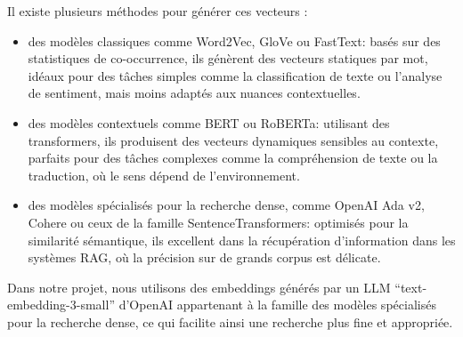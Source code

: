 Il existe plusieurs méthodes pour générer ces vecteurs :
\begin{itemize}[label=\textbullet]
    \item des modèles classiques comme Word2Vec, GloVe ou FastText: basés sur des statistiques de co-occurrence, ils génèrent des vecteurs statiques par mot, idéaux pour des tâches simples comme la classification de texte ou l’analyse de sentiment, mais moins adaptés aux nuances contextuelles.
    \item des modèles contextuels comme BERT ou RoBERTa: utilisant des transformers, ils produisent des vecteurs dynamiques sensibles au contexte, parfaits pour des tâches complexes comme la compréhension de texte ou la traduction, où le sens dépend de l’environnement.
    \item des modèles spécialisés pour la recherche dense, comme OpenAI Ada v2, Cohere ou ceux de la famille SentenceTransformers: optimisés pour la similarité sémantique, ils excellent dans la récupération d’information dans les systèmes RAG, où la précision sur de grands corpus est délicate.
\end{itemize}
Dans notre projet, nous utilisons des embeddings générés par un LLM “text-embedding-3-small” d'OpenAI appartenant à la famille des modèles spécialisés pour la recherche dense, ce qui facilite ainsi une recherche plus fine et appropriée.

